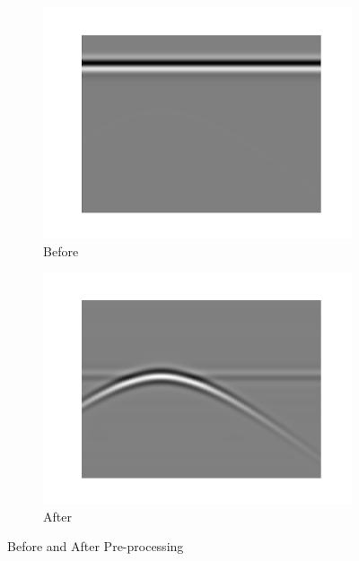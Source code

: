\begin{figure}[H]
    \centering
    \begin{subfigure}[b]{0.45\linewidth}
        \includegraphics[width=\linewidth]{figures/before_preprocessing.png}
        \caption{Before}
    \end{subfigure}
    \begin{subfigure}[b]{0.45\linewidth}
        \includegraphics[width=\linewidth]{figures/after_preprocessing.png}
        \caption{After}
    \end{subfigure}
    \caption{Before and After Pre-processing}
    \label{fig:preprocessing}
\end{figure}

